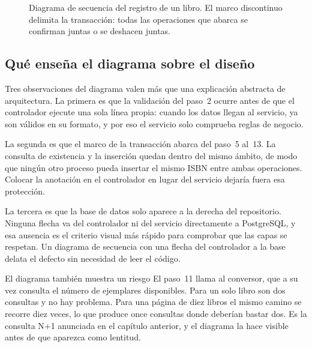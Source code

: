 \documentclass[11pt,a4paper,openany]{book}
\begin{document}
\begin{figure}[htbp]
{}
	\caption{Diagrama de secuencia del registro de un libro. El marco discontinuo delimita la transacción: todas las operaciones que abarca se confirman juntas o se deshacen juntas.}
	\label{fig:secuencia}
\end{figure}

\subsection{Qué enseña el diagrama sobre el diseño}
\label{sec:ensena-secuencia}

Tres observaciones del diagrama valen más que una explicación abstracta de arquitectura. La primera es que la validación del paso~2 ocurre antes de que el controlador ejecute una sola línea propia: cuando los datos llegan al servicio, ya son válidos en su formato, y por eso el servicio solo comprueba reglas de negocio.

La segunda es que el marco de la transacción abarca del paso~5 al~13. La consulta de existencia y la inserción quedan dentro del mismo ámbito, de modo que ningún otro proceso pueda insertar el mismo ISBN entre ambas operaciones. Colocar la anotación en el controlador en lugar del servicio dejaría fuera esa protección.

La tercera es que la base de datos solo aparece a la derecha del repositorio. Ninguna flecha va del controlador ni del servicio directamente a PostgreSQL, y esa ausencia es el criterio visual más rápido para comprobar que las capas se respetan. Un diagrama de secuencia con una flecha del controlador a la base delata el defecto sin necesidad de leer el código.

\begin{cajaadvertencia}{El diagrama también muestra un riesgo}
	El paso~11 llama al conversor, que a su vez consulta el número de ejemplares disponibles. Para un solo libro son dos consultas y no hay problema. Para una página de diez libros el mismo camino se recorre diez veces, lo que produce once consultas donde deberían bastar dos. Es la consulta N+1 anunciada en el capítulo anterior, y el diagrama la hace visible antes de que aparezca como lentitud.
\end{cajaadvertencia}
\end{document}
